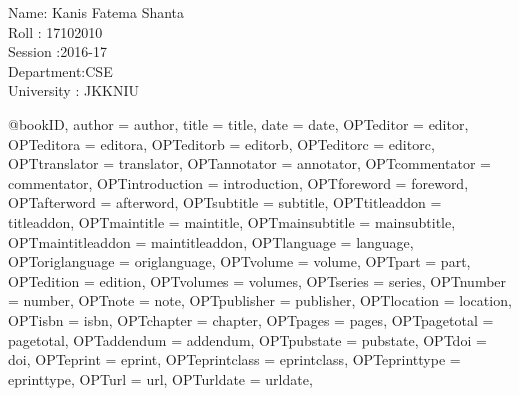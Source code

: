 \documentclass[12pt,A4]{article}
\begin{document}
	\begin{center}
		Name: Kanis Fatema Shanta\\
		Roll :  17102010\\
   		Session :2016-17\\
   		Department:CSE \\
   		University : JKKNIU
	\end{center}
@book{ID,
	author = {author},
	title = {title},
	date = {date},
	OPTeditor = {editor},
	OPTeditora = {editora},
	OPTeditorb = {editorb},
	OPTeditorc = {editorc},
	OPTtranslator = {translator},
	OPTannotator = {annotator},
	OPTcommentator = {commentator},
	OPTintroduction = {introduction},
	OPTforeword = {foreword},
	OPTafterword = {afterword},
	OPTsubtitle = {subtitle},
	OPTtitleaddon = {titleaddon},
	OPTmaintitle = {maintitle},
	OPTmainsubtitle = {mainsubtitle},
	OPTmaintitleaddon = {maintitleaddon},
	OPTlanguage = {language},
	OPToriglanguage = {origlanguage},
	OPTvolume = {volume},
	OPTpart = {part},
	OPTedition = {edition},
	OPTvolumes = {volumes},
	OPTseries = {series},
	OPTnumber = {number},
	OPTnote = {note},
	OPTpublisher = {publisher},
	OPTlocation = {location},
	OPTisbn = {isbn},
	OPTchapter = {chapter},
	OPTpages = {pages},
	OPTpagetotal = {pagetotal},
	OPTaddendum = {addendum},
	OPTpubstate = {pubstate},
	OPTdoi = {doi},
	OPTeprint = {eprint},
	OPTeprintclass = {eprintclass},
	OPTeprinttype = {eprinttype},
	OPTurl = {url},
	OPTurldate = {urldate},
}
\end{document}
